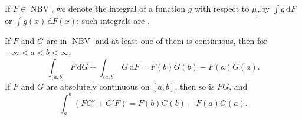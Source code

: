 \documentclass[12pt]{article}	%
\DeclareMathOperator{\NBV}{NBV}
\begin{document}
If $F \in \NBV$, we denote the integral of a function $g$ with respect to $\mu_{F}$by $\int g \,{\mathrm d} F$ or $\int g(x) \,{\mathrm d}F(x)$; such integrals are .

\begin{thm}
	If $F$ and $G$ are in $\NBV$ and at least one of them is continuous, then for $-\infty < a < b < \infty$,
	\begin{equation*} 
		\int_{(a, b]} F \,{\mathrm{d}}G + \int_{(a, b]} G \,{\mathrm{d}}F = F(b) G(b) - F(a) G(a).
	\end{equation*}
	If $F$ and $G$ are absolutely continuous on $[a, b]$, then so is $FG$, and
	\begin{equation*} 
		\int_{a}^{b} (FG' + G'F) = F(b) G(b) - F(a) G(a).
	\end{equation*}
\end{thm}
\end{document}

